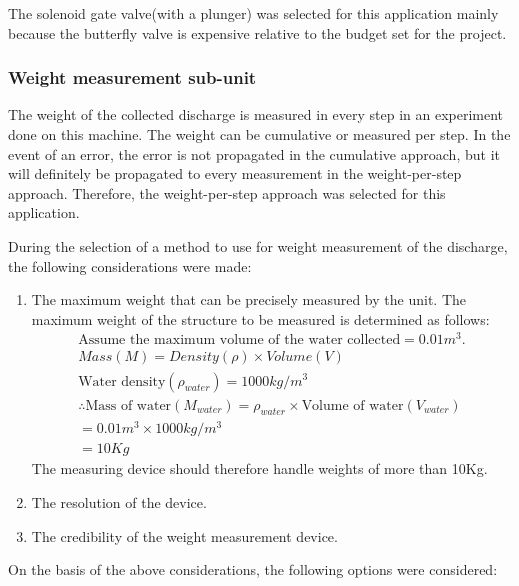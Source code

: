 The solenoid gate valve(with a plunger) was selected for this application mainly because the butterfly valve is expensive relative to the budget set for the project.

\subsubsection{Weight measurement sub-unit}
The weight of the collected discharge is measured in every step in an experiment done on this machine. The weight can be cumulative or measured per step. In the event of an error, the error is not propagated in the cumulative approach, but it will definitely be propagated to every measurement in the weight-per-step approach. Therefore, the weight-per-step approach was selected for this application.
\par
During the selection of a method to use for weight measurement of the discharge, the following considerations were made:
\begin{enumerate}
    \item The maximum weight that can be precisely measured by the unit. The maximum weight of the structure to be measured is determined as follows:\\
    \begin{align*}
    \text{Assume the maximum volume of the water collected} = 0.01m^{3}.\\
    Mass(M) = Density(\rho) \times Volume(V)\\
    \text{Water density} (\rho_{\textit{water}}) = 1000kg/m^{3}\\
    \therefore  \text{Mass of water} (M_{\textit{water}}) = \rho_{\textit{water}} \times \text{Volume of water} (V_{\textit{water}}) \\
    = 0.01m^{3} \times 1000kg/m^{3} \\
    = 10 Kg
    \end{align*}
    The measuring device should therefore handle weights of more than 10Kg.
    \item The resolution of the device.
    \item The credibility of the weight measurement device.
\end{enumerate}
On the basis of the above considerations, the following options were considered:
